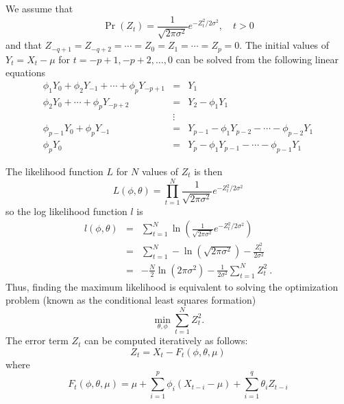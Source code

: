 \documentclass[english,10pt]{llncs}
\begin{document}
We assume that
\begin{equation}
\Pr(Z_t) = \frac{1}{\sqrt{2 \pi \sigma^2}} e^{-Z^2_t/2 \sigma^2}, \quad t > 0
\end{equation}
and that  $Z_{-q+1} = Z_{-q+2} = \cdots = Z_0 = Z_1 = \cdots = Z_p =
0$. The initial values of $Y_t=X_t-\mu$ for $t=-p+1, -p+2, \dots,
0$ can be solved from the following linear equations
\begin{eqnarray}
\phi_1 Y_0 + \phi_2 Y_{-1} + \cdots + \phi_p Y_{-p+1} &=& Y_1 \nonumber\\
\phi_2 Y_0 + \cdots + \phi_p Y_{-p+2} &=& Y_2 - \phi_1 Y_1  \nonumber\\
&\vdots& \nonumber\\
\phi_{p-1} Y_0 + \phi_p Y_{-1} &=& Y_{p-1} - \phi_1 Y_{p-2} - \cdots -
\phi_{p-2} Y_1 \nonumber \\
\phi_p Y_0  &=& Y_p - \phi_1 Y_{p-1} - \cdots - \phi_{p-1} Y_{1} \label{eq:init_Y}
\end{eqnarray}

The likelihood function $L$ for $N$ values of $Z_t$  is then
\begin{equation}
L(\phi, \theta) = \prod_{t = 1}^N  \frac{1}{\sqrt{2 \pi \sigma^2}} e^{-Z^2_t/2 \sigma^2}
\end{equation}
so the log likelihood function $l$ is
\begin{eqnarray}
  l(\phi, \theta) &=& \sum_{t = 1}^N \ln \left(\frac{1}{\sqrt{2 \pi \sigma^2}}
    e^{-Z^2_t/2 \sigma^2}
  \right) \nonumber\\
  &=&  \sum_{t = 1}^N  - \ln \left( \sqrt{2 \pi \sigma^2}\right)
  -\frac{Z^2_t}{2 \sigma^2}\nonumber\\
  &=&  -\frac{N}{2} \ln \left( 2 \pi \sigma^2\right)  - \frac{1}{2
    \sigma^2} \sum_{t = 1}^N   Z^2_t\ . \label{eq:loglikelihood}
\end{eqnarray}
Thus, finding the maximum likelihood is equivalent to solving the
optimization problem (known as the conditional least squares
formation)
\begin{equation}
\min_{\theta, \phi} \sum_{t = 1}^N  Z^2_t.
\end{equation}
The error term $Z_t$ can be computed iteratively as follows:
\begin{equation}
    Z_t = X_t - F_t(\phi, \theta, \mu) \label{eq:error-terms}
\end{equation}
where
\begin{equation}
F_t(\phi, \theta, \mu) = \mu + \sum_{i=1}^p \phi_i (X_{t-i}-\mu) + \sum_{i=1}^q
\theta_i Z_{t-i}
\end{equation}
\end{document}
